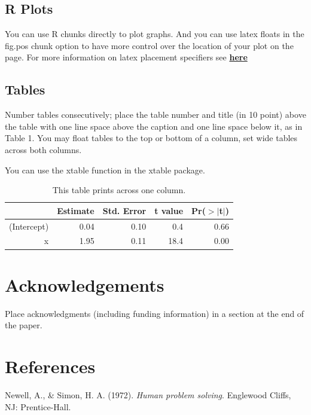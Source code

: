 \documentclass[10pt, letterpaper]{article}
\begin{document}
\subsection{R Plots}\label{r-plots}

You can use R chunks directly to plot graphs. And you can use latex
floats in the fig.pos chunk option to have more control over the
location of your plot on the page. For more information on latex
placement specifiers see
\textbf{\href{https://en.wikibooks.org/wiki/LaTeX/Floats,_Figures_and_Captions}{here}}

\subsection{Tables}\label{tables}

Number tables consecutively; place the table number and title (in 10
point) above the table with one line space above the caption and one
line space below it, as in Table 1. You may float tables to the top or
bottom of a column, set wide tables across both columns.

You can use the xtable function in the xtable package.

\begin{table}[H]
\centering
\begin{tabular}{rrrrr}
  \hline
 & Estimate & Std. Error & t value & Pr($>$$|$t$|$) \\ 
  \hline
(Intercept) & 0.04 & 0.10 & 0.4 & 0.66 \\ 
  x & 1.95 & 0.11 & 18.4 & 0.00 \\ 
   \hline
\end{tabular}
\caption{This table prints across one column.} 
\end{table}

\section{Acknowledgements}\label{acknowledgements}

Place acknowledgments (including funding information) in a section at
the end of the paper.

\section{References}\label{references}

\setlength{\parindent}{-0.1in} \setlength{\leftskip}{0.125in} \noindent

\hypertarget{refs}{}
\hypertarget{ref-NewellSimon1972a}{}
Newell, A., \& Simon, H. A. (1972). \emph{Human problem solving}.
Englewood Cliffs, NJ: Prentice-Hall.
\end{document}
